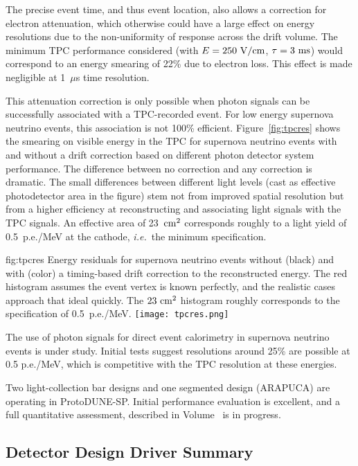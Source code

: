 The precise event time, and thus event location, also allows a 
correction for electron attenuation, which otherwise could have 
a large effect on energy resolutions due to the non-uniformity
of response across the drift volume.  
The minimum TPC performance 
considered (with $E=250~\rm{V/cm}$, $\tau=3~\rm{ms}$) would 
correspond to an energy smearing of 22\% due to electron loss.  
This effect is made negligible at 1~$\mu$s time resolution.

This attenuation correction is only possible when photon signals can be successfully associated with a TPC-recorded event.  For low energy supernova neutrino events, this association is not 
100\% efficient.  Figure~\ref{fig:tpcres} shows the smearing on visible energy in the TPC for supernova neutrino events with and without a drift correction based on different photon detector system performance.  The difference between no correction and any correction is dramatic.  The small differences between different light levels (cast as effective photodetector area in the figure) stem not from improved spatial resolution but from a higher efficiency at reconstructing and associating light signals with the TPC signals.  An effective area of 23~$\rm{cm}^2$ corresponds roughly to a light yield of 0.5~p.e./MeV at the cathode, {\em i.e.}\ the minimum specification.
%
\begin{dunefigure}
{fig:tpcres}
{Energy residuals for supernova neutrino events without (black) 
and with (color) a timing-based drift correction to the 
reconstructed energy.  The red histogram assumes the event 
vertex is known perfectly, and the realistic cases approach that
ideal quickly.  The $23~\rm{cm}^2$ histogram roughly corresponds 
to the specification of 0.5~p.e./MeV.}
  \texttt{[image: tpcres.png]}
\end{dunefigure}

The use of photon signals for direct event calorimetry in 
supernova neutrino events is under study. Initial tests suggest 
resolutions around 25\% are possible at 0.5 p.e./MeV, which is
competitive with the TPC resolution at these energies.

Two light-collection bar designs and one segmented design 
(ARAPUCA) are operating in ProtoDUNE-SP.  Initial performance 
evaluation is excellent, and a full quantitative assessment, 
described in Volume~\voltitlesp{} 
is in progress.

\subsection{Detector Design Driver Summary}

